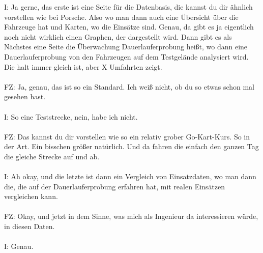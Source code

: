 \begin{linenumbers}
I: Ja gerne, das erste ist eine Seite für die Datenbasis, die kannst du dir ähnlich vorstellen wie bei Porsche. Also wo man dann auch eine Übersicht über die Fahrzeuge hat und Karten, wo die Einsätze sind. Genau, da gibt es ja eigentlich noch nicht wirklich einen Graphen, der dargestellt wird. Dann gibt es als Nächstes eine Seite die Überwachung Dauerlauferprobung heißt, wo dann eine Dauerlauferprobung von den Fahrzeugen auf dem Testgelände analysiert wird. Die halt immer gleich ist, aber X Umfahrten zeigt.\\\\
FZ: Ja, genau, das ist so ein Standard. Ich weiß nicht, ob du so etwas schon mal gesehen hast.\\\\
I: So eine Teststrecke, nein, habe ich nicht.\\\\
FZ: Das kannst du dir vorstellen wie so ein relativ grober Go-Kart-Kurs. So in der Art. Ein bisschen größer natürlich. Und da fahren die einfach den ganzen Tag die gleiche Strecke auf und ab.\\\\
I: Ah okay, und die letzte ist dann ein Vergleich von Einsatzdaten, wo man dann die, die auf der Dauerlauferprobung erfahren hat, mit realen Einsätzen vergleichen kann.\\\\
FZ: Okay, und jetzt in dem Sinne, was mich als Ingenieur da interessieren würde, in diesen Daten.\\\\
I: Genau.\\\\

\end{linenumbers}
